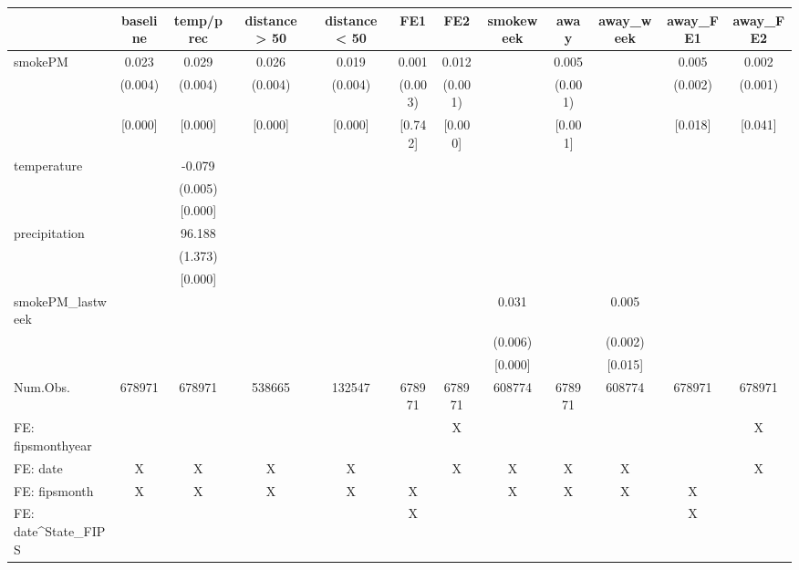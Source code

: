 \begin{table}
\centering
\begin{tabular}[t]{lccccccccccc}
\toprule
  & baseline & temp/prec & distance > 50 & distance < 50 & FE1 & FE2 & smokeweek & away & away\_week & away\_FE1 & away\_FE2\\
\midrule
smokePM & 0.023 & 0.029 & 0.026 & 0.019 & 0.001 & 0.012 &  & 0.005 &  & 0.005 & 0.002\\
 & (0.004) & (0.004) & (0.004) & (0.004) & (0.003) & (0.001) &  & (0.001) &  & (0.002) & (0.001)\\
 & {}[0.000] & {}[0.000] & {}[0.000] & {}[0.000] & {}[0.742] & {}[0.000] &  & {}[0.001] &  & {}[0.018] & {}[0.041]\\
temperature &  & -0.079 &  &  &  &  &  &  &  &  & \\
 &  & (0.005) &  &  &  &  &  &  &  &  & \\
 &  & {}[0.000] &  &  &  &  &  &  &  &  \vphantom{1} & \\
precipitation &  & 96.188 &  &  &  &  &  &  &  &  & \\
 &  & (1.373) &  &  &  &  &  &  &  &  & \\
 &  & {}[0.000] &  &  &  &  &  &  &  &  & \\
smokePM\_lastweek &  &  &  &  &  &  & 0.031 &  & 0.005 &  & \\
 &  &  &  &  &  &  & (0.006) &  & (0.002) &  & \\
 &  &  &  &  &  &  & {}[0.000] &  & {}[0.015] &  & \\
\midrule
Num.Obs. & 678971 & 678971 & 538665 & 132547 & 678971 & 678971 & 608774 & 678971 & 608774 & 678971 & 678971\\
FE: fipsmonthyear &  &  &  &  &  & X &  &  &  &  & X\\
FE: date & X & X & X & X &  & X & X & X & X &  & X\\
FE: fipsmonth & X & X & X & X & X &  & X & X & X & X & \\
FE: date^State_FIPS &  &  &  &  & X &  &  &  &  & X & \\
\bottomrule
\end{tabular}
\end{table}
